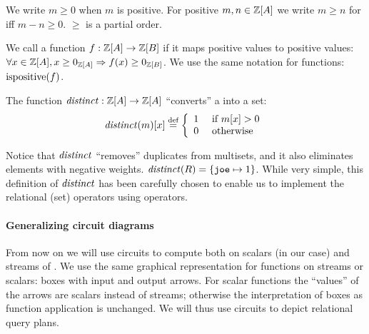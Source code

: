 We write $m \geq 0$ when $m$ is positive.  For positive $m, n \in
\mathbb{Z}[A]$ we write $m \geq n$ for iff $m - n \geq 0$.  $\geq$ is a
partial order.

We call a function $f : \mathbb{Z}[A] \rightarrow \mathbb{Z}[B]$  if it maps
positive values to positive values:
$\forall x \in \mathbb{Z}[A], x \geq 0_{\mathbb{Z}[A]} \Rightarrow f(x) \geq 0_{\mathbb{Z}[B]}$.
We use the same notation for functions: $\mbox{ispositive}(f)$.

\begin{definition}[distinct]
The function $\mathit{distinct}: \mathbb{Z}[A] \rightarrow \mathbb{Z}[A]$
``converts'' a \zr into a set:
$$\distinct(m)[x] \defn \left\{
\begin{array}{ll}
  1 & \mbox{ if } m[x] > 0 \\
  0 & \mbox{ otherwise}
\end{array}
\right.
$$
\end{definition}

Notice that $\mathit{distinct}$ ``removes'' duplicates from multisets, and it also eliminates
elements with negative weights.
\ifzsetexamples
$\mathit{distinct}(R) = \{ \texttt{joe} \mapsto 1 \}$.
\fi
While very simple, this definition of $\mathit{distinct}$ has been carefully
chosen to enable us to implement the relational (set) operators
using \zrs operators.

%
%
\paragraph{Generalizing circuit diagrams}

From now on we will use circuits to compute both on scalars (\zrs in our case) and streams of \zrs.
We use the same graphical representation for functions on streams or scalars:
boxes with input and output arrows.  For scalar functions the ``values''
of the arrows are scalars instead of streams; otherwise
the interpretation of boxes as function application is unchanged.  We will
thus use circuits to depict relational query plans.

